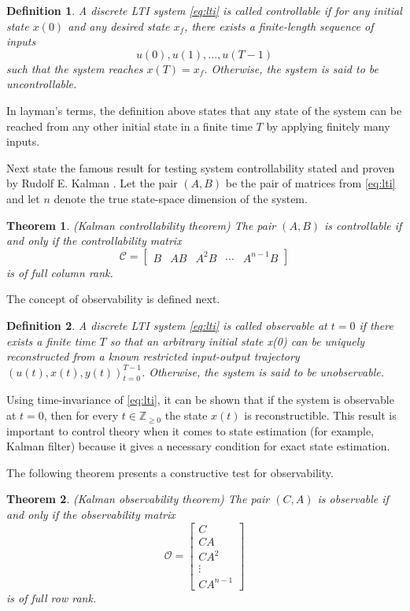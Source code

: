 \documentclass[12pt,a4paper]{report}
\newtheorem{definition}{Definition}
\newtheorem{theorem}{Theorem}
\begin{document}
\begin{definition}
    A discrete LTI system \eqref{eq:lti} is called controllable if for any initial state $x(0)$ and any desired state $x_f$, there exists
    a finite-length sequence of inputs
    \[u(0), u(1), ..., u(T-1)\]
    such that the system reaches \(x(T) = x_f\). Otherwise, the system is said to be uncontrollable.
\end{definition}

In layman's terms, the definition above states that any state of the system can be reached from any other initial state in a finite time $T$ by applying finitely many inputs.

Next state the famous result for testing system controllability stated and proven by Rudolf E. Kalman \cite{kalman1960newapproach}. Let the pair $(A, B)$ be the pair of matrices from \eqref{eq:lti} and let $n$ denote
the true state-space dimension of the system.

\begin{theorem}(Kalman controllability theorem)
    The pair $(A, B)$ is controllable if and only if the controllability matrix
    \[ \mathcal{C} = \begin{bmatrix} B & AB & A^{2}B & \cdots & A^{n-1}B\end{bmatrix}\]
    is of full column rank.
    \label{thm:ctrb}
\end{theorem}

The concept of observability is defined next.

\begin{definition}
    A discrete LTI system \eqref{eq:lti} is called observable at $t = 0$ if there exists a finite time $T$ so that an arbitrary initial state x(0) can be uniquely reconstructed from a known
    restricted input-output trajectory \(\left(u(t), x(t), y(t) \right)_{t=0}^{T-1}\). Otherwise, the system is said to be unobservable.
\end{definition}

Using time-invariance of \eqref{eq:lti}, it can be shown that if the system is observable at $t = 0$, then for every  \(t \in \mathbb{Z}_{\ge 0}\) the state $x(t)$ is reconstructible.
This result is important to control theory when it comes to state estimation (for example, Kalman filter) because it gives a necessary condition for exact state estimation.

The following theorem presents a constructive test for observability.

\begin{theorem}(Kalman observability theorem)
    The pair $(C, A)$ is observable if and only if the observability matrix
    \[ \mathcal{O} = \begin{bmatrix} C \\ CA \\ CA^{2} \\ \vdots \\ CA^{n-1}\end{bmatrix}\]
    is of full row rank.
    \label{thm:obsv}
\end{theorem}
\end{document}
